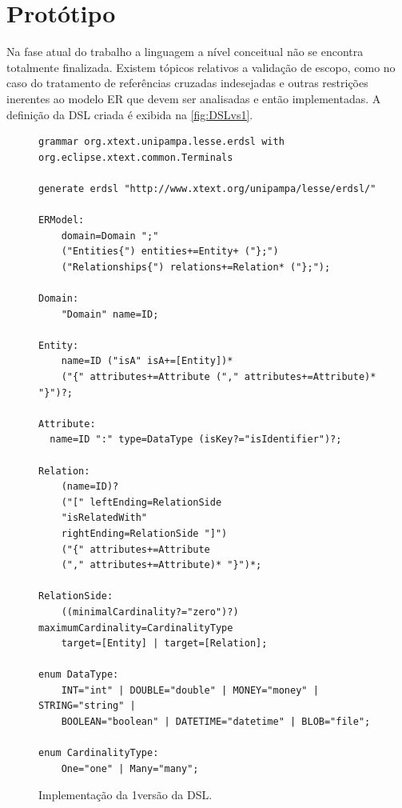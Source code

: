 \section{Protótipo} \label{sec:protDSL}


Na fase atual do trabalho a linguagem a nível conceitual não se encontra totalmente finalizada. 
Existem tópicos relativos a validação de escopo, como no caso do tratamento de referências cruzadas indesejadas e outras restrições inerentes ao modelo \ac{ER} que devem ser analisadas e então implementadas. 
A definição da \ac{DSL} criada é exibida na \autoref{fig:DSLvs1}.

\lstset{basicstyle=\scriptsiz}
\begin{figure}
    \centering
    \caption{Implementação da 1\degree versão da DSL.}
    \label{fig:DSLvs1}
    \begin{scriptsize}
    \begin{lstlisting}[language = Xtext , frame = trbl]
grammar org.xtext.unipampa.lesse.erdsl with org.eclipse.xtext.common.Terminals

generate erdsl "http://www.xtext.org/unipampa/lesse/erdsl/"

ERModel:
	domain=Domain ";"
	("Entities{") entities+=Entity+ ("};")
	("Relationships{") relations+=Relation* ("};");

Domain:
	"Domain" name=ID;

Entity:
	name=ID ("isA" isA+=[Entity])* 
	("{" attributes+=Attribute ("," attributes+=Attribute)* "}")?;

Attribute:
  name=ID ":" type=DataType (isKey?="isIdentifier")?;

Relation:
	(name=ID)? 
	("[" leftEnding=RelationSide 
	"isRelatedWith" 
	rightEnding=RelationSide "]")
	("{" attributes+=Attribute 
	("," attributes+=Attribute)* "}")*;
	
RelationSide:
	((minimalCardinality?="zero")?)	maximumCardinality=CardinalityType	
	target=[Entity] | target=[Relation];

enum DataType:
	INT="int" | DOUBLE="double" | MONEY="money" | STRING="string" | 
	BOOLEAN="boolean" | DATETIME="datetime" | BLOB="file";

enum CardinalityType:
	One="one" | Many="many";
    \end{lstlisting}
    \end{scriptsize}    
\end{figure}


